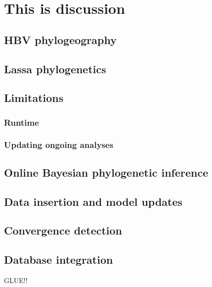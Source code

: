 \chapter{This is discussion}\label{ch:discussion}

\section{HBV phylogeography}

\section{Lassa phylogenetics}

\section{Limitations}

\subsection{Runtime}

\subsection{Updating ongoing analyses}

\section{Online Bayesian phylogenetic inference}

\section{Data insertion and model updates}

\section{Convergence detection}

\section{Database integration}

GLUE!!






\cleardoublepage

